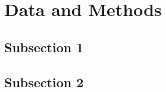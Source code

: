 
\section{Data and Methods}
\label{sec:data_meas}


\subsection{Subsection 1}
\label{subsec:data_1}


\subsection{Subsection 2}
\label{subsec:data_2}